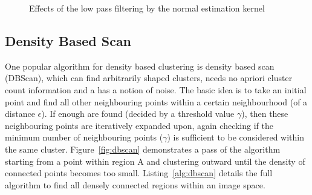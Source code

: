 \documentclass[]{article}
\begin{document}
{\begin{figure}[p]
	\centering     %
	\;

	\caption{Effects of the low pass filtering by the normal estimation kernel}
	\label{fig:spurious_plane_normals}
\end{figure}

\subsection{Density Based Scan} %
\label{sub:density_based_scan}


One popular algorithm for density based clustering is density based scan (DBScan), which can find arbitrarily shaped clusters, needs no apriori cluster count information and a has a notion of noise. The basic idea is to take an initial point and find all other neighbouring points within a certain neighbourhood (of a distance $\epsilon$). If enough are found (decided by a threshold value $\gamma$), then these neighbouring points are iteratively expanded upon, again checking if the minimum number of neighbouring points ($\gamma$) is sufficient to be considered within the same cluster. Figure~\ref{fig:dbscan} demonstrates a pass of the algorithm starting from a point within region A and clustering outward until the density of connected points becomes too small. Listing~\ref{alg:dbscan} details the full algorithm to find all densely connected regions within an image space.

}
\end{document}
